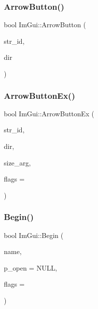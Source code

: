 \mbox{\label{namespaceImGui_ad2bc397a02d5e4b8a14360d89abc6242}} 
\subsubsection{\texorpdfstring{Arrow\+Button()}{ArrowButton()}}
{\footnotesize\ttfamily bool Im\+Gui\+::\+Arrow\+Button (\begin{DoxyParamCaption}\item[{const char $\ast$}]{str\+\_\+id,  }\item[{Im\+Gui\+Dir}]{dir }\end{DoxyParamCaption})}

\mbox{\label{namespaceImGui_ab05ee8e53f29fbb84942a494f2ac3292}} 
\subsubsection{\texorpdfstring{Arrow\+Button\+Ex()}{ArrowButtonEx()}}
{\footnotesize\ttfamily bool Im\+Gui\+::\+Arrow\+Button\+Ex (\begin{DoxyParamCaption}\item[{const char $\ast$}]{str\+\_\+id,  }\item[{Im\+Gui\+Dir}]{dir,  }\item[{\hyperlink{structImVec2}{Im\+Vec2}}]{size\+\_\+arg,  }\item[{Im\+Gui\+Button\+Flags}]{flags = {} }\end{DoxyParamCaption})}

\mbox{\label{namespaceImGui_a581e58db0bc930bafa4a5d23093a2b99}} 
\subsubsection{\texorpdfstring{Begin()}{Begin()}}
{\footnotesize\ttfamily bool Im\+Gui\+::\+Begin (\begin{DoxyParamCaption}\item[{const char $\ast$}]{name,  }\item[{bool $\ast$}]{p\+\_\+open = {\ttfamily NULL},  }\item[{Im\+Gui\+Window\+Flags}]{flags = {} }\end{DoxyParamCaption})}

